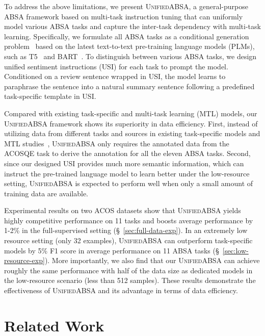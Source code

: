 \documentclass[11pt]{article}
\newcommand{\UnifiedABSA}{\textsc{UnifiedABSA}\xspace}
\newcommand{\USI}{\textsc{USI}\xspace}
\begin{document}
To address the above limitations, we present \UnifiedABSA, a general-purpose ABSA framework based on multi-task instruction tuning that can uniformly model various ABSA tasks and capture the inter-task dependency with multi-task learning. 
Specifically, we formulate all ABSA tasks as a conditional
generation problem~\citep{yan-etal-2021-unified,zhang-etal-2021-gas,zhang-etal-2021-paraphrase} based on the latest text-to-text pre-training language models (PLMs), such as T5~\citep{raffel2020t5} and BART~\citep{lewis-etal-2020-bart}. To distinguish between various ABSA tasks, we design unified sentiment instructions (\USI) for each task to prompt the model. Conditioned on a review sentence wrapped in \USI, the model learns to paraphrase the sentence into a natural summary sentence following a predefined task-specific template in \USI.



Compared with existing task-specific and multi-task learning (MTL) models, our \UnifiedABSA framework shows its superiority in data efficiency.
First, instead of utilizing data from different tasks and sources in existing task-specific models and MTL studies~\citep{khashabi-etal-2020-unifiedqa,DBLP:journals/corr/abs-2201-05966-unifiedskg}, \UnifiedABSA only requires the annotated data from the ACOSQE task to derive the annotation for all the eleven ABSA tasks. 
Second, since our designed \USI provides much more semantic information, which can instruct the pre-trained language model to learn better under the low-resource setting, \UnifiedABSA is expected to perform well when only a small amount of training data are available. 
 
 
Experimental results on two ACOS datasets show that \UnifiedABSA yields highly competitive performance on 11 tasks and boosts average performance by 1-2\% in the full-supervised setting (\S~\ref{sec:full-data-exp}). In an extremely low resource setting (only 32 examples), \UnifiedABSA can outperform task-specific models by 5\% F1 score in average performance on 11 ABSA tasks (\S~\ref{sec:low-resource-exp}).
More importantly, we also find that our \UnifiedABSA can achieve roughly the same performance with half of the data size as dedicated models in the low-resource scenario (less than 512 samples). These results demonstrate the effectiveness of \UnifiedABSA and its advantage in terms of data efficiency.




\section{Related Work}
\end{document}

